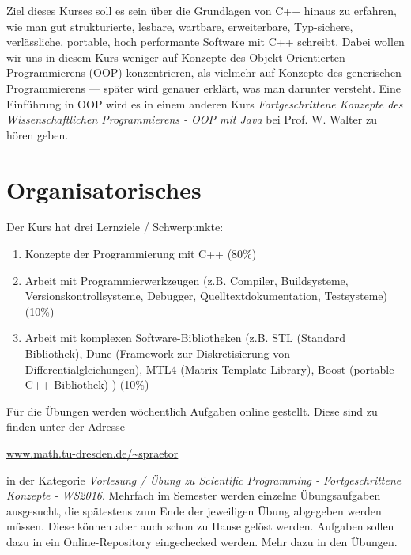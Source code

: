 Ziel dieses Kurses soll es sein über die Grundlagen von C++ hinaus zu erfahren, wie man gut strukturierte, lesbare, wartbare, erweiterbare, Typ-sichere, verlässliche, portable, hoch performante Software mit C++ schreibt. Dabei wollen wir uns in diesem Kurs weniger auf Konzepte des Objekt-Orientierten Programmierens (OOP) konzentrieren, als vielmehr auf Konzepte des generischen Programmierens --- später wird genauer erklärt, was man darunter versteht. Eine Einführung in OOP wird es in einem anderen Kurs \textit{Fortgeschrittene Konzepte des Wissenschaftlichen Programmierens - OOP mit Java} bei Prof. W. Walter zu hören geben.

\section{Organisatorisches}
Der Kurs hat drei Lernziele / Schwerpunkte:
\begin{enumerate}[1)]
\item Konzepte der Programmierung mit C++ (80\%)
\item Arbeit mit Programmierwerkzeugen (z.B. Compiler, Buildsysteme, Versionskontrollsysteme, Debugger, Quelltextdokumentation, Testsysteme) (10\%)
\item Arbeit mit komplexen Software-Bibliotheken (z.B. STL (Standard Bibliothek), Dune (Framework zur Diskretisierung von Differentialgleichungen), MTL4 (Matrix Template Library), Boost (portable C++ Bibliothek) ) (10\%)
\end{enumerate}

Für die Übungen werden wöchentlich Aufgaben online gestellt. Diese sind zu finden unter der Adresse

\url{www.math.tu-dresden.de/~spraetor}

in der Kategorie \textit{Vorlesung / Übung zu Scientific Programming - Fortgeschrittene Konzepte - WS2016}. Mehrfach im Semester werden einzelne Übungsaufgaben ausgesucht, die spätestens zum Ende der jeweiligen Übung abgegeben werden müssen. Diese können aber auch schon zu Hause gelöst werden. Aufgaben sollen dazu in ein Online-Repository eingechecked werden. Mehr dazu in den Übungen.

